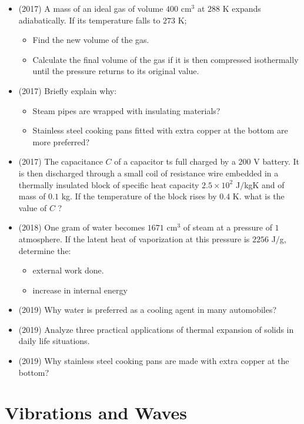 \documentclass{article}
\begin{document}
\begin{itemize}
\item (2017)  A mass of an ideal gas of volume $ 400$ cm$ ^{3}$ at $ 288$ K expands adiabatically. If its temperature falls to $ 273$ K;\begin{itemize}
\item Find the new volume of the gas. 
\item Calculate the final volume of the gas if it is then compressed isothermally until the pressure returns to its original value.
\end{itemize}
\item (2017)  Briefly explain why:\begin{itemize}
\item Steam pipes are wrapped with insulating materials?
\item Stainless steel cooking pans fitted with extra copper at the bottom are more preferred?
\end{itemize}
\item (2017)  The capacitance $ C$ of a capacitor ts full charged by a $ 200$ V battery. It is then discharged through a small coil of resistance wire embedded in a thermally insulated block of specific heat capacity $ 2.5 \times 10^{2}$ J$/$kgK and of mass of $ 0.1$ kg.  If the temperature of the block rises by $ 0.4$ K. what is the value of $ C$ ?
\item (2018)  One gram of water becomes $ 1671 $ cm$ ^{3}$ of steam at a pressure of $ 1$ atmosphere. If the latent heat of vaporization at this pressure is $ 2256$ J$/$g, determine the:\begin{itemize}
\item external work done. 
\item increase in internal energy 
\end{itemize}
\item (2019)  Why water is preferred as a cooling agent in many automobiles?
\item (2019)  Analyze  three practical applications of thermal expansion of solids in daily life situations.
\item (2019)  Why stainless steel cooking pans are made with extra copper at the bottom?
\end{itemize}


\section{Vibrations and Waves}
\end{document}
